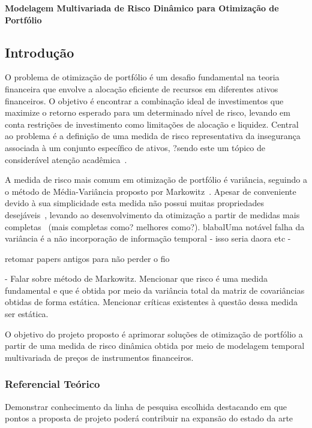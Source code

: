 \documentclass[a4paper, 12pt]{article}
\begin{document}
\textbf{\large Modelagem Multivariada de Risco Dinâmico para Otimização de
Portfólio}

\subsection*{Introdução}

O problema de otimização de portfólio é um desafio fundamental na teoria
financeira que envolve a alocação eficiente de recursos em diferentes ativos
financeiros. O objetivo é encontrar a combinação ideal de investimentos que
maximize o retorno esperado para um determinado nível de risco, levando em
conta restrições de investimento como limitações de alocação e liquidez.
Central ao problema é a definição de uma medida de risco representativa da
insegurança associada à um conjunto específico de ativos, ?sendo este um tópico
de considerável atenção acadêmica~\cite{seleda}.

A medida de risco mais comum em otimização de portfólio é variância, seguindo a
o método de Média-Variância proposto por Markowitz~\cite{markowitz}. Apesar de
conveniente devido à sua simplicidade esta medida não possui muitas
propriedades desejáveis~\cite{}, levando ao desenvolvimento da otimização a
partir de medidas mais completas~\cite{risk_measures_portopt} (mais completas
como? melhores como?). blabalUma notável falha da variância é a não incorporação
de informação temporal - isso seria daora etc - 

retomar papers antigos para não perder o fio



- Falar sobre método de Markowitz. Mencionar que risco é uma medida fundamental
e que é obtida por meio da variância total da matriz de covariâncias obtidas
de forma estática. Mencionar críticas existentes à questão dessa medida ser
estática.

O objetivo do projeto proposto é aprimorar soluções de otimização de portfólio
a partir de uma medida de risco dinâmica obtida por meio de modelagem temporal
multivariada de preços de instrumentos financeiros.

\subsubsection*{Referencial Teórico}

Demonstrar conhecimento da linha de pesquisa escolhida destacando em que
pontos a proposta de projeto poderá contribuir na expansão do estado da arte
\end{document}

